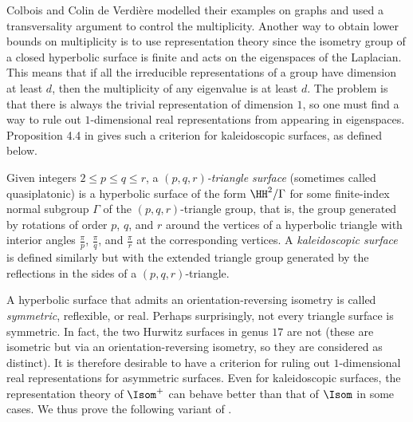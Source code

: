 \documentclass[12pt]{amsart}
\numberwithin{equation}{section}
\begin{document}
Colbois and Colin de Verdière modelled their examples on graphs and used a transversality argument to control the multipli\-city. Another way to obtain lower bounds on multiplicity is to use representation theory \cite{Jenni,BurgerColbois,Cook,Klein} since the isometry group of a closed hyperbolic surface is finite and acts on the eigenspaces of the Laplacian. This means that if all the irreducible representations of a group have dimension at least $d$, then the multiplicity of any eigenvalue is at least $d$. The problem is that there is always the trivial representation of dimension $1$, so one must find a way to rule out $1$-dimensional real representations from appearing in eigenspaces. Proposition 4.4 in \cite{Klein} gives such a criterion for kaleidoscopic surfaces, as defined below.

Given integers $2\leq p \leq q \leq r$, a \emph{$(p,q,r)$-triangle surface} (sometimes called quasiplatonic) is a hyperbolic surface of the form $\HH^2/ \Gamma$ for some finite-index normal subgroup $\Gamma$ of the $(p,q,r)$-triangle group, that is, the group generated by rotations of order $p$, $q$, and $r$ around the vertices of a hyperbolic triangle with interior angles $\frac{\pi}{p}$, $\frac{\pi}{q}$, and $\frac{\pi}{r}$ at the corresponding vertices. A \emph{kaleidoscopic surface} is defined similarly but with the extended triangle group generated by the reflections in the sides of a $(p,q,r)$-triangle.

A hyperbolic surface that admits an orientation-reversing isometry is called \emph{symmetric}, reflexible, or real. Perhaps surprisingly, not every triangle surface is symmetric. In fact, the two Hurwitz surfaces in genus $17$ are not \cite[Theorem 5]{Singerman} (these are isometric but via an orientation-reversing isometry, so they are considered as distinct). It is therefore desirable to have a criterion for ruling out $1$-dimensional real representations for asymmetric surfaces. Even for kaleidoscopic surfaces, the representation theory of $\Isom^+$ can behave better than that of $\Isom$ in some cases. We thus prove the following variant of \cite[Proposition 4.4]{Klein}.
\end{document}
